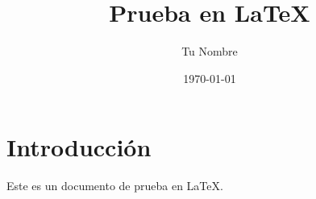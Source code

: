 \documentclass{article}
\title{Prueba en LaTeX}
\author{Tu Nombre}
\date{\today}
\begin{document}
\maketitle

\section{Introducción}
Este es un documento de prueba en LaTeX.
\end{document}
